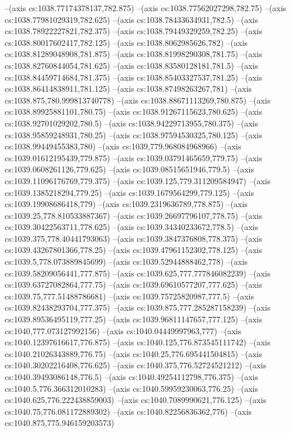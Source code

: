 --(axis cs:1038.77174378137,782.875)
--(axis cs:1038.77562027298,782.75)
--(axis cs:1038.77981029319,782.625)
--(axis cs:1038.78433634931,782.5)
--(axis cs:1038.78922227821,782.375)
--(axis cs:1038.79449329259,782.25)
--(axis cs:1038.80017602417,782.125)
--(axis cs:1038.8062985626,782)
--(axis cs:1038.81289048908,781.875)
--(axis cs:1038.81998290308,781.75)
--(axis cs:1038.82760844054,781.625)
--(axis cs:1038.83580128181,781.5)
--(axis cs:1038.84459714684,781.375)
--(axis cs:1038.85403327537,781.25)
--(axis cs:1038.86414838911,781.125)
--(axis cs:1038.87498263267,781)
--(axis cs:1038.875,780.999813740778)
--(axis cs:1038.88671113269,780.875)
--(axis cs:1038.89925881101,780.75)
--(axis cs:1038.91267115623,780.625)
--(axis cs:1038.92701029202,780.5)
--(axis cs:1038.94229713955,780.375)
--(axis cs:1038.95859248931,780.25)
--(axis cs:1038.97594530325,780.125)
--(axis cs:1038.99449455383,780)
--(axis cs:1039,779.968084968966)
--(axis cs:1039.01612195439,779.875)
--(axis cs:1039.03791465659,779.75)
--(axis cs:1039.0608261126,779.625)
--(axis cs:1039.08515651946,779.5)
--(axis cs:1039.11096176769,779.375)
--(axis cs:1039.125,779.311209584947)
--(axis cs:1039.1385218294,779.25)
--(axis cs:1039.1679564299,779.125)
--(axis cs:1039.19908686418,779)
--(axis cs:1039.2319636789,778.875)
--(axis cs:1039.25,778.810533887367)
--(axis cs:1039.26697796107,778.75)
--(axis cs:1039.30422563711,778.625)
--(axis cs:1039.34340233672,778.5)
--(axis cs:1039.375,778.40441793063)
--(axis cs:1039.3847376808,778.375)
--(axis cs:1039.43267801366,778.25)
--(axis cs:1039.47961152302,778.125)
--(axis cs:1039.5,778.073889845699)
--(axis cs:1039.52944888462,778)
--(axis cs:1039.58209056441,777.875)
--(axis cs:1039.625,777.777846082239)
--(axis cs:1039.63727082864,777.75)
--(axis cs:1039.69610577207,777.625)
--(axis cs:1039.75,777.51488786681)
--(axis cs:1039.75725820987,777.5)
--(axis cs:1039.82438293704,777.375)
--(axis cs:1039.875,777.285287158239)
--(axis cs:1039.89536495119,777.25)
--(axis cs:1039.96811147657,777.125)
--(axis cs:1040,777.073127992156)
--(axis cs:1040.04449997963,777)
--(axis cs:1040.12397616617,776.875)
--(axis cs:1040.125,776.873545111742)
--(axis cs:1040.21026343889,776.75)
--(axis cs:1040.25,776.695441504815)
--(axis cs:1040.30202216408,776.625)
--(axis cs:1040.375,776.52724521212)
--(axis cs:1040.39493086148,776.5)
--(axis cs:1040.49254112798,776.375)
--(axis cs:1040.5,776.366312010283)
--(axis cs:1040.59959230063,776.25)
--(axis cs:1040.625,776.222438859003)
--(axis cs:1040.7089990621,776.125)
--(axis cs:1040.75,776.081172889302)
--(axis cs:1040.82256836362,776)
--(axis cs:1040.875,775.946159203573)
